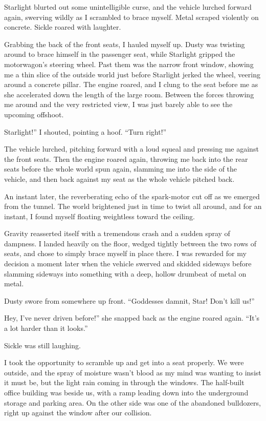 Starlight blurted out some unintelligible curse, and the vehicle lurched forward again, swerving wildly as I scrambled to brace myself. Metal scraped violently on concrete. Sickle roared with laughter.

Grabbing the back of the front seats, I hauled myself up. Dusty was twisting around to brace himself in the passenger seat, while Starlight gripped the motorwagon’s steering wheel. Past them was the narrow front window, showing me a thin slice of the outside world just before Starlight jerked the wheel, veering around a concrete pillar. The engine roared, and I clung to the seat before me as she accelerated down the length of the large room. Between the forces throwing me around and the very restricted view, I was just barely able to see the upcoming offshoot.

\leavevmode{}Starlight!” I shouted, pointing a hoof. “Turn right!”

The vehicle lurched, pitching forward with a loud squeal and pressing me against the front seats. Then the engine roared again, throwing me back into the rear seats before the whole world spun again, slamming me into the side of the vehicle, and then back against my seat as the whole vehicle pitched back.

An instant later, the reverberating echo of the spark-motor cut off as we emerged from the tunnel. The world brightened just in time to twist all around, and for an instant, I found myself floating weightless toward the ceiling.

Gravity reasserted itself with a tremendous crash and a sudden spray of dampness. I landed heavily on the floor, wedged tightly between the two rows of seats, and chose to simply brace myself in place there. I was rewarded for my decision a moment later when the vehicle swerved and skidded sideways before slamming sideways into something with a deep, hollow drumbeat of metal on metal.

Dusty swore from somewhere up front. “Goddesses damnit, Star! Don’t kill us!”

\leavevmode{}Hey, I’ve never driven before!” she snapped back as the engine roared again. “It’s a lot harder than it looks.”

Sickle was still laughing.

I took the opportunity to scramble up and get into a seat properly. We were outside, and the spray of moisture wasn’t blood as my mind was wanting to insist it must be, but the light rain coming in through the windows. The half-built office building was beside us, with a ramp leading down into the underground storage and parking area. On the other side was one of the abandoned bulldozers, right up against the window after our collision.

